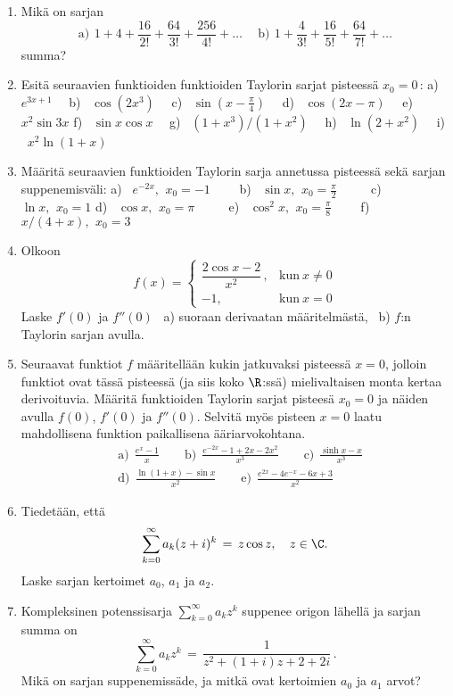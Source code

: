 \Harj
\begin{enumerate}

\item
Mikä on sarjan
\[
\text{a)}\,\ 1+4+\frac{16}{2!}+\frac{64}{3!}+\frac{256}{4!}+ \ldots \quad\
\text{b)}\,\ 1+\frac{4}{3!}+\frac{16}{5!}+\frac{64}{7!}+ \ldots  
\]
summa?

\item
Esitä seuraavien funktioiden funktioiden Taylorin sarjat
pisteessä $x_0=0\,$: \vspace{1mm}\newline
a) \ $e^{3x+1}\quad$ 
b) \ $\cos(2x^3)\quad$ 
c) \ $\sin(x-\frac{\pi}{4})\quad$ 
d) \ $\cos(2x-\pi)\quad$ 
e) \ $x^2\sin 3x$\vspace{1mm}\newline
f) \ $\sin x\cos x\quad$ 
g) \ $(1+x^3)/(1+x^2)\quad$ 
h) \ $\ln(2+x^2)\quad$ 
i) \ $x^2\ln(1+x)$

\item
Määritä seuraavien funktioiden Taylorin sarja annetussa pisteessä sekä sarjan
suppenemisväli: \vspace{1mm}\newline
a) \ $e^{-2x},\,\ x_0=-1 \qquad$
b) \ $\sin x,\,\ x_0=\tfrac{\pi}{2} \qquad\,\ $
c) \ $\ln x,\,\ x_0=1$ \newline
d) \ $\cos x,\,\ x_0=\pi \qquad\,\ $
e) \ $\cos^2 x,\,\ x_0=\tfrac{\pi}{8} \qquad$ 
f) \ $x/(4+x),\,\ x_0=3$

\item
Olkoon
\[
f(x)= \begin{cases} 
      \dfrac{2\cos x-2}{x^2}\,, &\text{kun}\ x \neq 0 \\[2mm] -1, &\text{kun}\ x=0
      \end{cases}
\]
Laske $f'(0)$ ja $f''(0)$ \ a) suoraan derivaatan määritelmästä, \ b) $f$:n Taylorin sarjan
avulla.

\item
Seuraavat funktiot $f$ määritellään kukin jatkuvaksi pisteessä $x=0$, jolloin funktiot ovat
tässä pisteessä (ja siis koko $\R$:ssä) mielivaltaisen monta kertaa derivoituvia. Määritä
funktioiden Taylorin sarjat pisteesä $x_0=0$ ja näiden avulla $f(0)$, $f'(0)$ ja $f''(0)$.
Selvitä myös pisteen $x=0$ laatu mahdollisena funktion paikallisena ääriarvokohtana.
\begin{align*}
&\text{a)}\ \ \frac{e^x-1}{x} \qquad 
 \text{b)}\ \ \frac{e^{-2x}-1+2x-2x^2}{x^3} \qquad
 \text{c)}\ \ \frac{\sinh x-x}{x^3} \\
&\text{d)}\ \ \frac{\ln(1+x)-\sin x}{x^2} \qquad
 \text{e)}\ \ \frac{e^{2x}-4e^{-x}-6x+3}{x^2}
\end{align*}

\item
Tiedetään, että
\[
\sum_{k=0}^\infty a_k(z+i)^k\,=\,z\cos z, \quad z\in\C.
\]
Laske sarjan kertoimet $a_0$, $a_1$ ja $a_2$.

\item
Kompleksinen potenssisarja $\sum_{k=0}^\infty a_k z^k$ suppenee origon lähellä ja sarjan
summa on
\[
\sum_{k=0}^\infty a_k z^k\,=\,\frac{1}{z^2+(1+i)z+2+2i}\,.
\]
Mikä on sarjan suppenemissäde, ja mitkä ovat kertoimien $a_0$ ja $a_1$ arvot?

\end{enumerate}

